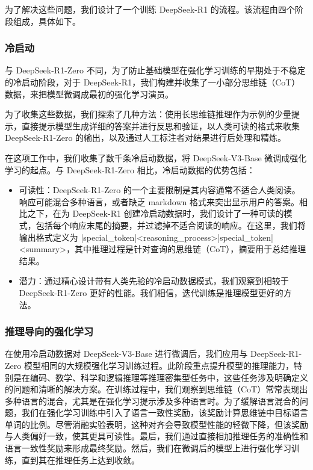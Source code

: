 \documentclass[lang=cn,a4paper,newtx]{elegantpaper}
\newcommand{\dsri}{DeepSeek-R1}
\newcommand{\dsro}{DeepSeek-R1-Zero}
\begin{document}
为了解决这些问题，我们设计了一个训练 \dsri{} 的流程。该流程由四个阶段组成，具体如下。

\subsubsection{冷启动}

与 \dsro{} 不同，为了防止基础模型在强化学习训练的早期处于不稳定的冷启动阶段，对于 DeepSeek-R1，我们构建并收集了一小部分思维链（CoT）数据，来把模型微调成最初的强化学习演员。

为了收集这些数据，我们探索了几种方法：使用长思维链推理作为示例的少量提示，直接提示模型生成详细的答案并进行反思和验证，以人类可读的格式来收集 \dsro{} 的输出，以及通过人工标注者对结果进行后处理和精炼。

在这项工作中，我们收集了数千条冷启动数据，将 DeepSeek-V3-Base 微调成强化学习的起点。与 \dsro{} 相比，冷启动数据的优势包括：

\begin{itemize}[topsep=0pt]
  \item 可读性：\dsro{} 的一个主要限制是其内容通常不适合人类阅读。响应可能混合多种语言，或者缺乏 markdown 格式来突出显示用户的答案。相比之下，在为 \dsri{} 创建冷启动数据时，我们设计了一种可读的模式，包括每个响应末尾的摘要，并过滤掉不适合阅读的响应。在这里，我们将输出格式定义为 |special\_token|<reasoning\_process>|special\_token|<summary>，其中推理过程是针对查询的思维链（CoT），摘要用于总结推理结果。
  \item 潜力：通过精心设计带有人类先验的冷启动数据模式，我们观察到相较于 \dsro{} 更好的性能。我们相信，迭代训练是推理模型更好的方法。
\end{itemize}

\subsubsection{推理导向的强化学习}

在使用冷启动数据对 DeepSeek-V3-Base 进行微调后，我们应用与 \dsro{} 模型相同的大规模强化学习训练过程。此阶段重点提升模型的推理能力，特别是在编码、数学、科学和逻辑推理等推理密集型任务中，这些任务涉及明确定义的问题和清晰的解决方案。在训练过程中，我们观察到思维链（CoT）常常表现出多种语言的混合，尤其是在强化学习提示涉及多种语言时。为了缓解语言混合的问题，我们在强化学习训练中引入了语言一致性奖励，该奖励计算思维链中目标语言单词的比例。尽管消融实验表明，这种对齐会导致模型性能的轻微下降，但该奖励与人类偏好一致，使其更具可读性。最后，我们通过直接相加推理任务的准确性和语言一致性奖励来形成最终奖励。然后，我们在微调后的模型上进行强化学习训练，直到其在推理任务上达到收敛。
\end{document}
